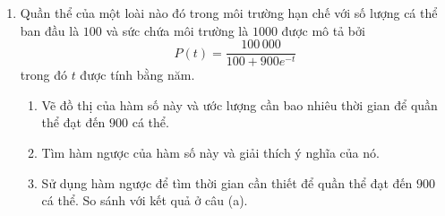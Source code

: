 \begin{minipage}[t]{0.485\textwidth}
\begin{enumerate}[label=\textbf{\arabic*.}, leftmargin=*, start=37]
    \item Quần thể của một loài nào đó trong môi trường hạn chế với số lượng cá thể ban đầu là $100$ và sức chứa môi trường là $1000$ được mô tả bởi
    \[
    P(t) = \frac{100\,000}{100 + 900e^{-t}}
    \]
    trong đó $t$ được tính bằng năm.
    \begin{enumerate}[label=(\alph*), leftmargin=*]
        \item[{\llap{\graphcalcicon\hspace{0.4em}}(a)}] Vẽ đồ thị của hàm số này và ước lượng cần bao nhiêu thời gian để quần thể đạt đến $900$ cá thể.
        \item Tìm hàm ngược của hàm số này và giải thích ý nghĩa của nó.
        \item Sử dụng hàm ngược để tìm thời gian cần thiết để quần thể đạt đến $900$ cá thể. So sánh với kết quả ở câu (a).
    \end{enumerate}
\end{enumerate}

\end{minipage}